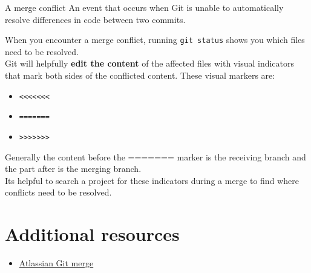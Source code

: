\begin{infobox}{A merge conflict}
	An event that occurs when Git is unable to automatically resolve differences in code between two commits.
\end{infobox}

When you encounter a merge conflict, running \texttt{git status} shows you which files need to be resolved.
\\

Git will helpfully \textbf{edit the content} of the affected files with visual indicators that mark both sides of the conflicted content. These visual markers are: 

\begin{itemize}
    \item \texttt{<<<<<<<}
    \item \texttt{=======}
    \item \texttt{>>>>>>>}
\end{itemize}

Generally the content before the ======= marker is the receiving branch and the part after is the merging branch.
\\

Its helpful to search a project for these indicators during a merge to find where conflicts need to be resolved.
\\


\section{Additional resources}

\begin{itemize}[leftmargin=*]
    \item \href{https://www.atlassian.com/git/tutorials/using-branches/git-merge}{Atlassian Git merge}
\end{itemize}
